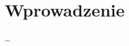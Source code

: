 \documentclass[thesis.tex]{subfiles}
\begin{document}
\chapter{Wprowadzenie}

\ldots
\end{document}
